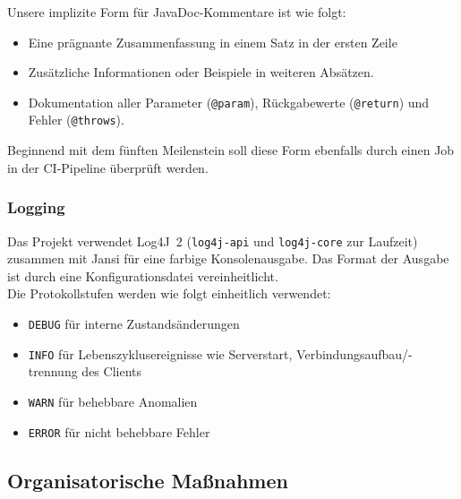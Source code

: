 \documentclass{article}
\begin{document}
Unsere implizite Form für JavaDoc-Kommentare ist wie folgt:
\begin{itemize}
  \item Eine prägnante Zusammenfassung in einem Satz in der ersten Zeile
  \item Zusätzliche Informationen oder Beispiele in weiteren Absätzen.
  \item Dokumentation aller Parameter (\texttt{@param}), Rückgabewerte (\texttt{@return}) und Fehler (\texttt{@throws}).
\end{itemize}
Beginnend mit dem fünften Meilenstein soll diese Form ebenfalls durch einen Job in der CI-Pipeline überprüft werden.

\newpage
\subsubsection{Logging}
Das Projekt verwendet Log4J~2 (\texttt{log4j-api} und \texttt{log4j-core} zur Laufzeit) zusammen mit Jansi für eine farbige Konsolenausgabe.
Das Format der Ausgabe ist durch eine Konfigurationsdatei vereinheitlicht.\\

Die Protokollstufen werden wie folgt einheitlich verwendet:
\begin{itemize}
  \item \texttt{DEBUG} für interne Zustandsänderungen
  \item \texttt{INFO} für Lebenszyklusereignisse wie Serverstart, Verbindungsaufbau/-trennung des Clients
  \item \texttt{WARN} für behebbare Anomalien
  \item \texttt{ERROR} für nicht behebbare Fehler
\end{itemize}

\subsection{Organisatorische Maßnahmen}
\end{document}
